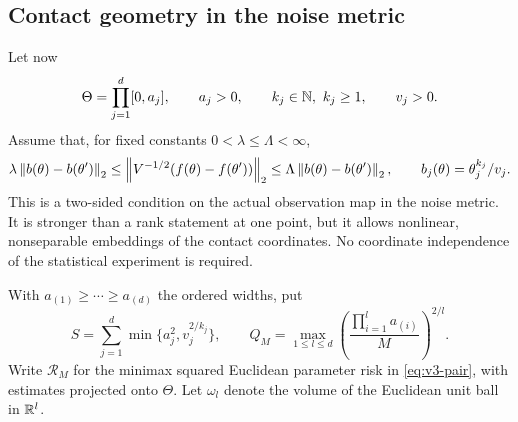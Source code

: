 \subsection{Contact geometry in the noise metric}
Let now
\[
 \Theta=\prod_{j=1}^d[0,a_j],\qquad a_j>0,
 \qquad k_j\in\mathbb N,\ k_j\ge1,\qquad v_j>0.
\]
Assume that, for fixed constants $0<\lambda\le\Lambda<\infty$,
\begin{equation}\label{eq:v3-contact-metric}
 \lambda\left\lVert b(\theta)-b(\theta')\right\rVert_2
 \le\left\lVert V^{-1/2}(f(\theta)-f(\theta'))\right\rVert_2
 \le\Lambda\left\lVert b(\theta)-b(\theta')\right\rVert_2,
 \qquad b_j(\theta)=\theta_j^{k_j}/v_j.
\end{equation}
This is a two-sided condition on the actual observation map in the noise
metric. It is stronger than a rank statement at one point, but it allows
nonlinear, nonseparable embeddings of the contact coordinates. No
coordinate independence of the statistical experiment is required.

With $a_{(1)}\ge\cdots\ge a_{(d)}$ the ordered widths, put
\begin{equation}\label{eq:v3-contact-profile}
 S=\sum_{j=1}^d\min\{a_j^2,v_j^{2/k_j}\},\qquad
 Q_M=\max_{1\le l\le d}
       \left(\frac{\prod_{i=1}^l a_{(i)}}M\right)^{2/l}.
\end{equation}
Write $\mathcal R_M$ for the minimax squared Euclidean parameter risk
in \eqref{eq:v3-pair}, with estimates projected onto $\Theta$.
Let $\omega_l$ denote the volume of the Euclidean unit ball in $\mathbb R^l$.

